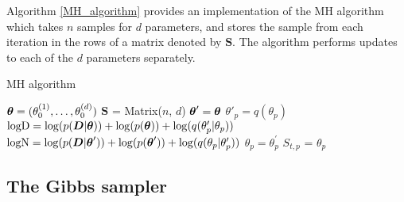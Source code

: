Algorithm \ref{MH_algorithm} provides an implementation of the \gls{MH} algorithm which takes \(n\) samples for \(d\)
parameters, and stores the sample from each iteration in the rows of a matrix denoted by \(\boldsymbol{S}\). The
algorithm performs updates to each of the \(d\) parameters separately.
\begin{algorithm}
\caption{\label{MH_algorithm} MH algorithm} 
\begin{algorithmic}[1]

\State \(\boldsymbol{\theta} = (\theta_0^{(1)}, \ldots, \theta_{0}^{(d)})\)
\State \(\boldsymbol{S}\) = Matrix(\(n\), \(d\))
    \State \(\boldsymbol{\theta}' = \boldsymbol{\theta}\)
    \State \(\theta'_p = q(\theta_p)\)
    \State \(\text{logD} = \log(p(\boldsymbol{D} | \boldsymbol{\theta}))  + \log(p(\boldsymbol{\theta}))  + \log(q(\theta'_p | \theta_p))\)
    \State \(\text{logN} = \log(p(\boldsymbol{D} | \boldsymbol{\theta}')) + \log(p(\boldsymbol{\theta}')) + \log(q(\theta_p | \theta_p'))\)
      \State \(\theta_p = \theta^\prime_p\)
    \EndIf
    \State \(S_{t, p}\) = \(\theta_p\)
  \EndFor
\EndFor
\EndProcedure

\Statex

  \State {}
\EndFunction

\Statex

  \State {}
\EndFunction

\end{algorithmic}
\end{algorithm}

\subsection{The Gibbs sampler}
\label{sec:The_Gibbs_sampler}

